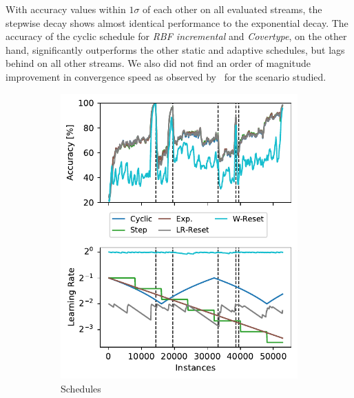 \documentclass{article} %
\begin{document}
With accuracy values within $1\sigma$ of each other on all evaluated streams, the stepwise decay shows almost identical performance to the exponential decay.
The accuracy of the cyclic schedule for \textit{RBF incremental} and \textit{Covertype}, on the other hand, significantly outperforms the other static and adaptive schedules, but lags behind on all other streams.
We also did not find an order of magnitude improvement in convergence speed as observed by~\citep{smithSuperConvergenceVeryFast2018a} for the scenario studied.

\def\asize{0.5\textwidth}
\begin{figure}[ht]
   \centering
   \begin{subfigure}[b]{\asize}
      \includegraphics[width=\textwidth]{figures/lr_norms_schedules_insects_abrupt.pdf}
      \caption{Schedules}
      \label{fig:prequential_schedulers_insects}
   \end{subfigure}
   \begin{subfigure}[b]{0.99\textwidth - \asize}

\end{subfigure}
\end{figure}
\end{document}
